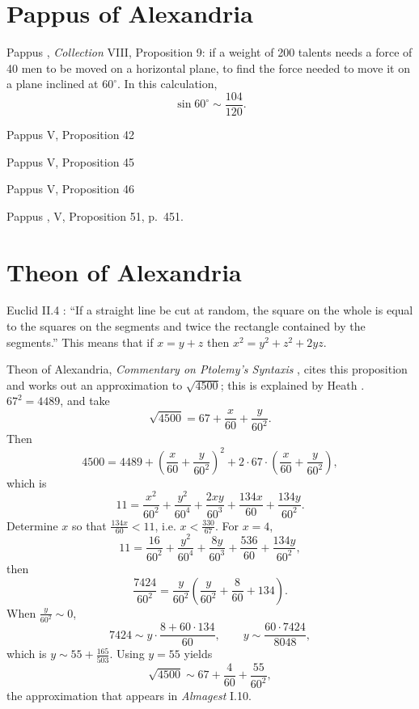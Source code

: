 \documentclass{article}
\theoremstyle{definition}
\begin{document}
\section{Pappus of Alexandria}
Pappus  \cite[pp.~1057--1059]{pappusIIIi}, {\em Collection} VIII, Proposition 9: 
if a weight of 200 talents needs a force of 40 men to be moved on a horizontal plane,
to find the force needed to move it on a plane inclined at $60^\circ$.
In this calculation,
\[
\sin 60^\circ \sim \frac{104}{120}.
\]

Pappus V, Proposition 42

Pappus V, Proposition 45

Pappus V, Proposition 46

Pappus \cite[p.~1244]{pappusIIIi}, V, Proposition 51, p.~451. 





\section{Theon of Alexandria}
Euclid II.4 \cite[p.~379]{euclidI}: ``If a straight line be cut at random, the square on the whole
is equal to the squares on the segments and twice the rectangle contained by the segments.''
This means that if $x=y+z$ then $x^2=y^2+z^2+2yz$. 

Theon of Alexandria, {\em Commentary on Ptolemy's Syntaxis} \cite[pp.~52--61]{thomasI},
cites this proposition and works out an approximation to 
$\sqrt{4500}$; this is explained by Heath \cite[pp.~60--63]{HGMI}.
$67^2=4489$, and take
\[
\sqrt{4500} = 67 + \frac{x}{60}+\frac{y}{60^2}.
\]
Then
\[
4500 = 4489 + \left(  \frac{x}{60}+\frac{y}{60^2} \right)^2 + 2 \cdot 67 \cdot  \left(  \frac{x}{60}+\frac{y}{60^2} \right),
\]
which is
\[
11 = \frac{x^2}{60^2}+\frac{y^2}{60^4} +  \frac{2xy}{60^3} + \frac{134x}{60} + \frac{134y}{60^2}.
\]
Determine $x$ so that $\frac{134x}{60} < 11$, i.e. $x<\frac{330}{67}$. For $x=4$,
\[
11 = \frac{16}{60^2} + \frac{y^2}{60^4} + \frac{8y}{60^3} + \frac{536}{60} + \frac{134y}{60^2},
\]
then
\[
\frac{7424}{60^2} =\frac{y}{60^2} \left(  \frac{y}{60^2} + \frac{8}{60} +134\right).
\]
When $\frac{y}{60^2} \sim 0$, 
\[
7424 \sim y \cdot \frac{8+60\cdot 134}{60}, \qquad y \sim 
\frac{60 \cdot 7424}{8048},
\]
which is $y \sim 55 + \frac{165}{503}$. Using $y=55$ yields
\[
\sqrt{4500} \sim 67 + \frac{4}{60} + \frac{55}{60^2},
\]
the approximation that appears in {\em Almagest} I.10.
\end{document}
